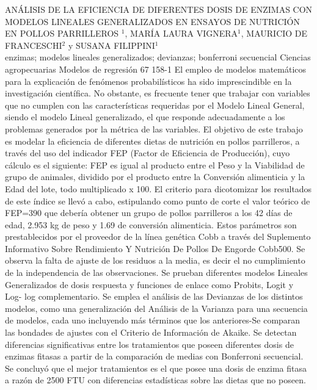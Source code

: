 \A
{ANÁLISIS DE LA EFICIENCIA DE DIFERENTES DOSIS DE ENZIMAS CON MODELOS LINEALES GENERALIZADOS EN ENSAYOS DE NUTRICIÓN EN POLLOS PARRILLEROS}
{$^1$, MARÍA LAURA VIGNERA$^1$, MAURICIO DE FRANCESCHI$^2$ y SUSANA FILIPPINI$^1$}
{
\\}
{enzimas; modelos lineales generalizados; devianzas; bonferroni secuencial} 
 {Ciencias agropecuarias} 
 {Modelos de regresión} 
 {67} 
 {158-1}
{El empleo de modelos matemáticos para la explicación de fenómenos probabilísticos ha sido imprescindible en la investigación científica. No obstante, es frecuente tener que trabajar con variables que no cumplen con las características requeridas por el Modelo Lineal General, siendo el modelo Lineal generalizado, el que responde adecuadamente a los problemas generados por la métrica de las variables. El objetivo de este trabajo es modelar la eficiencia de diferentes dietas de nutrición en pollos parrilleros, a través del uso del indicador FEP (Factor de Eficiencia de Producción), cuyo cálculo es el siguiente: FEP es igual al producto entre el Peso y la Viabilidad de grupo de animales, dividido por el producto entre la Conversión alimenticia y la Edad del lote, todo multiplicado x 100. El criterio para dicotomizar los resultados de este índice se llevó a cabo, estipulando como punto de corte el valor teórico de FEP=390 que debería obtener un grupo de pollos parrilleros a los 42 días de edad, 2.953 kg de peso y 1.69 de conversión alimenticia. Estos parámetros son prestablecidos por el proveedor de la línea genética Cobb a través del Suplemento Informativo Sobre Rendimiento Y Nutrición De Pollos De Engorde Cobb500. Se observa la falta de ajuste de los residuos a la media, es decir el no cumplimiento de la independencia de las observaciones. Se prueban diferentes modelos Lineales Generalizados de dosis respuesta y funciones de enlace como Probits, Logit y Log- log complementario. Se emplea el análisis de las Devianzas de los distintos modelos, como una generalización del Análisis de la Varianza para una secuencia de modelos, cada uno incluyendo más términos que los anteriores-Se comparan las bondades de ajustes con el Criterio de Información de Akaike. Se detectan diferencias significativas entre los tratamientos que poseen diferentes dosis de enzimas fitasas a partir de la comparación de medias con Bonferroni secuencial. Se concluyó que el mejor tratamientos es el que posee una dosis de enzima fitasa a razón de 2500 FTU con diferencias estadísticas sobre las dietas que no poseen. }
